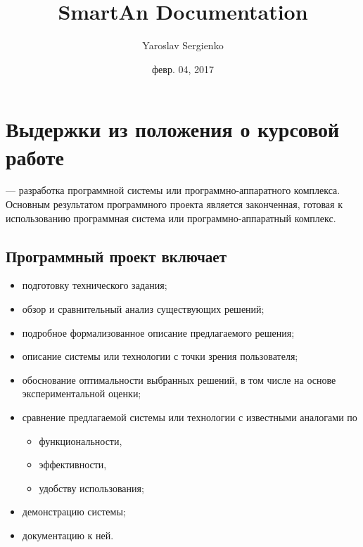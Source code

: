 \documentclass[letterpaper,10pt,russian]{sphinxmanual}
\title{SmartAn Documentation}
\date{февр. 04, 2017}
\author{Yaroslav Sergienko}
\begin{document}
\maketitle
\sphinxtableofcontents
{}\label{\detokenize{index::doc}}



\chapter{Выдержки из положения о курсовой работе}
\label{\detokenize{coursework::doc}}\label{\detokenize{coursework:smartan}}\label{\detokenize{coursework:id1}}
 --- разработка программной системы или программно-аппаратного комплекса. Основным результатом программного проекта является законченная, готовая к использованию программная система или программно-аппаратный комплекс.


\section{Программный проект включает}
\label{\detokenize{coursework:id2}}\begin{itemize}
\item {} 
подготовку технического задания;

\item {} 
обзор и сравнительный анализ существующих решений;

\item {} 
подробное формализованное описание предлагаемого решения;

\item {} 
описание системы или технологии с точки зрения пользователя;

\item {} 
обоснование оптимальности выбранных решений, в том числе на основе экспериментальной оценки;

\item {} 
сравнение предлагаемой системы или технологии с известными аналогами по
\begin{itemize}
\item {} 
функциональности,

\item {} 
эффективности,

\item {} 
удобству использования;

\end{itemize}

\item {} 
демонстрацию системы;

\item {} 
документацию к ней.

\end{itemize}
\end{document}
